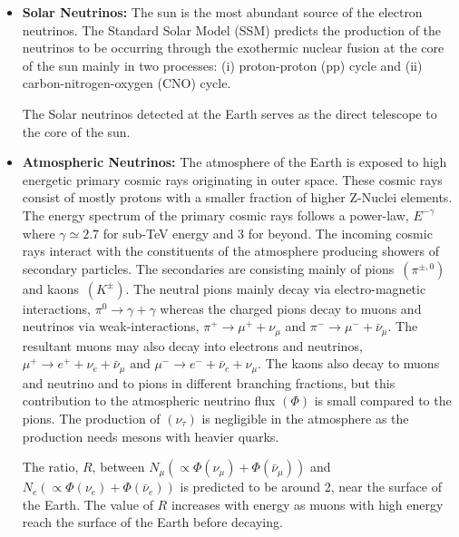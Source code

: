\begin{itemize}
\item \textbf{Solar Neutrinos:} The sun is the most abundant source of
  the electron neutrinos. The Standard Solar Model (SSM)\cite{SSM}
  predicts the production of the neutrinos to be occurring through the
  exothermic nuclear fusion at the core of the sun mainly in two
  processes: (i) proton-proton (pp) cycle and
  (ii) carbon-nitrogen-oxygen (CNO) cycle.
  
  The Solar neutrinos detected at the Earth serves as the direct
  telescope to the core of the sun.
  
\item \textbf{Atmospheric Neutrinos:} The atmosphere of the Earth is
  exposed to high energetic primary cosmic rays originating in outer
  space. These cosmic rays consist of mostly protons with a smaller
  fraction of higher \mbox{Z-Nuclei} elements\cite{cosmic1}. The
  energy spectrum of the primary cosmic rays follows a power-law,
  $E^{-\gamma}$ where $\gamma\simeq 2.7$ for sub-TeV energy and 3 for
  beyond. The incoming cosmic rays interact with the constituents
  of the atmosphere producing showers of secondary particles.
  The secondaries are consisting mainly of
  \mbox{pions $\left(\pi^{\pm,0}\right)$} and
  \mbox{kaons $\left(K^{\pm}\right)$}. The neutral pions mainly decay
  via electro-magnetic interactions, $\pi^0 \rightarrow \gamma+\gamma$
  whereas the charged pions decay to muons and neutrinos via
  weak-interactions, $\pi^+ \rightarrow \mu^+ + \nu_{\mu}$ and
  $\pi^- \rightarrow \mu^- + \bar{\nu}_{\mu}$. The resultant muons may
  also decay into electrons and neutrinos,
  $\mu^+ \rightarrow e^+ + \nu_{e} + \bar{\nu}_{\mu}$ and
  $\mu^- \rightarrow e^- + \bar{\nu}_{e} + \nu_{\mu}$. The kaons also
  decay to muons and neutrino and to pions in different branching
  fractions, but this contribution to the atmospheric neutrino flux
  $\left(\Phi\right)$ is small compared to the pions. The production
  of $\left(\nu_{\tau}\right)$ is negligible in the atmosphere as the
  production needs mesons with heavier quarks.
  
  The ratio, $R$, between $N_{\mu}\left(\propto \Phi\left(\nu_{\mu}\right)+\Phi\left(\bar{\nu}_{\mu}\right)\right)$ and $N_{e}\left( \propto\Phi\left(\nu_{e}\right)+\Phi\left(\bar{\nu}_{e}\right)\right)$ is predicted to be around 2,
  near the surface of the Earth. The value of $R$ increases with
  energy as muons with high energy reach the surface of the Earth
  before decaying.
  

\end{itemize}
